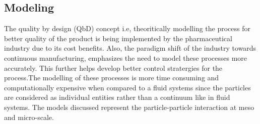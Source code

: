 \documentclass[preprint,11pt,authoryear]{elsarticle}
\begin{document}
	  \subsection{Modeling}
		\par The quality by design (QbD) concept i.e, theoritically modelling the process for better quality of the product is being implemented by the pharmaceutical industry due to its cost benefits. Also, the paradigm shift of the industry towards continuous manufacturing, emphasizes the need to model these processes more accurately. This further helps develop better control stratergies for the process.The modelling of these processes is more time consuming and computationally expensive when compared to a fluid systems since the particles are considered as individual entities rather than a continuum like in fluid systems. The models discussed represent the particle-particle interaction at meso and micro-scale.	  
\end{document}
